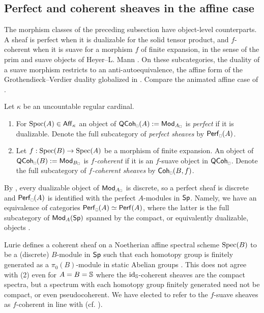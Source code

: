 \subsection{Perfect and coherent sheaves in the affine case}\label{subsec: affine perfect and coherent}
The morphism classes of the preceding subsection have object-level counterparts. A sheaf is perfect when it is dualizable for the solid tensor product, and $f$-coherent when it is suave for a morphism $f$ of finite expansion, in the sense of the prim and suave objects of Heyer--L. Mann \cite[\S 4.4 \& 4.5]{HeyerMann6FF}. On these subcategories, the duality of a suave morphism restricts to an anti-autoequivalence, the affine form of the Grothendieck--Verdier duality globalized in . Compare the animated affine case of \cite[Prop. 2.8.3]{HansenMannCLL}.
\begin{definition}\label{def: perfect and relatively coherent objects}
    Let $\kappa$ be an uncountable regular cardinal. 
    \begin{enumerate}
        \item For $\operatorname{Spec}(A)\in\mathsf{Aff}_{\kappa}$ an object of $\QCoh_{\sld}(A):=\Mod_{A_{\sld}}$ is \emph{perfect} if it is dualizable. Denote the full subcategory of \emph{perfect sheaves} by $\Perf_{\sld}(A)$.  
        \item Let $f:\operatorname{Spec}(B)\to\operatorname{Spec}(A)$ be a morphism of finite expansion. An object of $\QCoh_{\sld}(B):=\Mod_{B_{\sld}}$ is \emph{$f$-coherent} if it is an $f$-suave object in $\QCoh_{\sld}$. Denote the full subcategory of \emph{$f$-coherent sheaves} by $\Coh_{\sld}(B,f)$. 
    \end{enumerate}
\end{definition}
\begin{remark}\label{rmk: perfect sheaves discrete}
    By , every dualizable object of $\Mod_{A_{\sld}}$ is discrete, so a perfect sheaf is discrete and $\Perf_{\sld}(A)$ is identified with the perfect $A$-modules in $\mathsf{Sp}$. Namely, we have an equivalence of categories $\Perf_{\sld}(A)\simeq\Perf(A)$, where the latter is the full subcategory of $\mathsf{Mod}_{A}(\mathsf{Sp})$ spanned by the compact, or equivalently dualizable, objects \cite[Prop. 7.2.4.4]{HA}. 
\end{remark}
\begin{remark}\label{rmk: coherent sheaves}
    Lurie defines a coherent sheaf on a Noetherian affine spectral scheme $\operatorname{Spec}(B)$ to be a (discrete) $B$-module in $\mathsf{Sp}$ such that each homotopy group is finitely generated as a $\pi_{0}(B)$-module in static Abelian groups \cite[\S 6.4.3]{SAG}. This does not agree with  (2) even for $A=B=\mathbb{S}$ where the $\mathrm{id}_{\mathbb{S}}$-coherent sheaves are the compact spectra, but a spectrum with each homotopy group finitely generated need not be compact, or even pseudocoherent. We have elected to refer to the $f$-suave sheaves as $f$-coherent in line with \cite[\S 2.8]{HansenMannCLL} (cf. \cite[Cor. 2.8.4 (iii)]{HansenMannCLL}).  
\end{remark}
